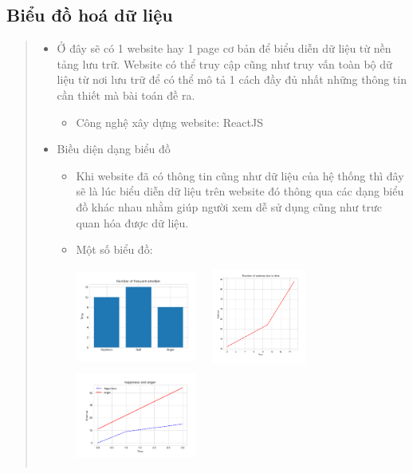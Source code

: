 \documentclass{article}
\begin{document}
\subsection{Biểu đồ hoá dữ liệu}
\begin{quote}
   \begin{itemize}
      \item Ở đây sẽ có 1 website hay 1 page cơ bản để biểu diễn dữ liệu từ nền tảng lưu trữ. Website có thể truy cập cũng như truy vấn toàn bộ dữ liệu từ nơi lưu trữ để có thể mô tả 1 cách đầy đủ nhất những thông tin cần thiết mà bài toán đề ra.
      \begin{itemize}
         \item Công nghệ xây dựng website: ReactJS
         \end{itemize}
      \item Biều diện dạng biểu đồ
      \begin{itemize}
         \item Khi website đã có thông tin cũng như dữ liệu của hệ thống thì đây sẽ là lúc biểu diễn dữ liệu trên website đó thông qua các dạng biểu đồ khác nhau nhằm giúp người xem dễ sử dụng cũng như trưc quan hóa được dữ liệu.
         \item Một số biểu đồ:
         \begin{center}
            \includegraphics[width=150px,height=120px]{chart_1.png}
            \includegraphics[width=150px,height=120px]{chart_2.png}
            \includegraphics[width=150px,height=120px]{chart_3.png}
         \end{center}   
      \end{itemize}
   \end{itemize}

\end{quote}
\end{document}

